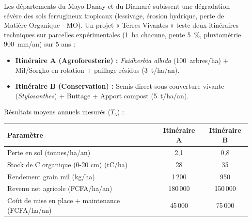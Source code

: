 \documentclass[11pt]{article}
\begin{document}
\begin{exercice}
Les départements du Mayo-Danay et du Diamaré subissent une dégradation sévère des sols ferrugineux tropicaux (lessivage, érosion hydrique, perte de Matière Organique - MO). Un projet « Terres Vivantes » teste deux itinéraires techniques sur parcelles expérimentales (\SI{1}{ha} chacune, pente \SI{5}{\%}, pluviométrie \SI{900}{mm/an}) sur 5 ans :
\begin{itemize}
    \item \textbf{Itinéraire A (Agroforesterie) :} \textit{Faidherbia albida} (\SI{100}{arbres/ha}) + Mil/Sorgho en rotation + paillage résidus (\SI{3}{t/ha/an}).
    \item \textbf{Itinéraire B (Conservation) :} Semis direct sous couverture vivante (\textit{Stylosanthes}) + Buttage + Apport compost (\SI{5}{t/ha/an}).
\end{itemize}
Résultats moyens annuels mesurés ($T_5$) :

\begin{tabular}{lcc}
\toprule
Paramètre & Itinéraire A & Itinéraire B \\
\midrule
Perte en sol (tonnes/ha/an) & 2,1 & 0,8 \\
Stock de C organique (0-20 cm) (tC/ha) & 28 & 35 \\
Rendement grain mil (kg/ha) & 1\,200 & 950 \\
Revenu net agricole (FCFA/ha/an) & 180\,000 & 150\,000 \\
Coût de mise en place + maintenance (FCFA/ha/an) & 45\,000 & 75\,000 \\
\bottomrule
\end{tabular}


\end{exercice}
\end{document}
